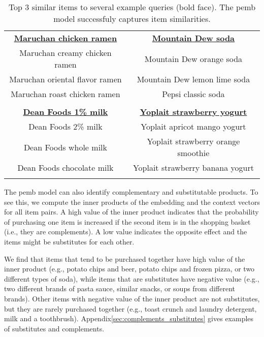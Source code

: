 \documentclass[12pt]{article}
\begin{document}
\begin{table}
	\centering
		\begin{tabular}{cc} 
\toprule
		\underline{{\bf Maruchan chicken ramen}}       & \underline{{\bf Mountain Dew soda}}       \\ 
		Maruchan creamy chicken ramen	   & Mountain Dew orange soda      \\
		Maruchan oriental flavor ramen	   & Mountain Dew lemon lime soda   \\
		Maruchan roast chicken ramen  	   & Pepsi classic soda		    \\ 
\\
		 \underline{{\bf Dean Foods 1\% milk}}           & \underline{{\bf Yoplait strawberry yogurt}} \\ 
	 Dean Foods 2\% milk           & Yoplait apricot mango yogurt        \\ 
	 Dean Foods whole milk         & Yoplait strawberry orange smoothie  \\ 
	 Dean Foods chocolate milk     & Yoplait strawberry banana yogurt    \\	
\bottomrule \\
	\end{tabular} 
	\vspace{-10pt}
	\caption{Top 3 similar items to several example queries (bold face). The \gls{pemb} model successfuly captures item similarities.\label{tab:iri_some_queries}}
\end{table}

The \gls{pemb} model can also identify complementary and substitutable
products. To see this, we compute the inner products of the embedding
and the context vectors for all item pairs. A high value of the inner
product indicates that the probability of purchasing one item is
increased if the second item is in the shopping basket (i.e., they are
complements). A low value indicates the opposite effect and the items
might be substitutes for each other.

We find that items that tend to be purchased together have high value
of the inner product (e.g., potato chips and beer, potato chips and
frozen pizza, or two different types of soda), while items that are
substitutes have negative value (e.g., two different brands of pasta
sauce, similar snacks, or soups from different brands).  Other items
with negative value of the inner product are not substitutes, but they
are rarely purchased together (e.g., toast crunch and laundry
detergent, milk and a toothbrush).  Appendix\nobreakspace \ref {sec:complements_substitutes}
gives examples of substitutes and complements.
\end{document}
